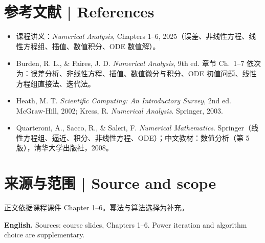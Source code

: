 \documentclass[UTF8,11pt,a4paper]{ctexart}
\newcommand{\EN}[1]{\par\noindent\textbf{English.} #1\par}
\begin{document}
\section*{参考文献 | References}
\begin{itemize}[itemsep=0pt,topsep=2pt]
\item 课程讲义：\emph{Numerical Analysis}, Chapters 1--6, 2025（误差、非线性方程、线性方程组、插值、数值积分、ODE 数值解）。
\item Burden, R. L., \& Faires, J. D. \emph{Numerical Analysis}, 9th ed. 章节 Ch.~1--7 依次为：误差分析、非线性方程、插值、数值微分与积分、ODE 初值问题、线性方程组直接法、迭代法。
\item Heath, M. T. \emph{Scientific Computing: An Introductory Survey}, 2nd ed. McGraw-Hill, 2002; Kress, R. \emph{Numerical Analysis}. Springer, 2003.
\item Quarteroni, A., Sacco, R., \& Saleri, F. \emph{Numerical Mathematics}. Springer（线性方程组、逼近、积分、非线性方程、ODE）；中文教材：数值分析（第 5 版），清华大学出版社，2008。
\end{itemize}
\section*{来源与范围 | Source and scope}
正文依据课程课件 Chapter 1--6。幂法与算法选择为补充。
\EN{Sources: course slides, Chapters 1--6. Power iteration and algorithm choice are supplementary.}
\end{document}
